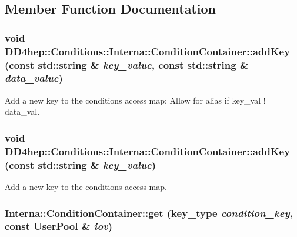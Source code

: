 \subsection{Member Function Documentation}
\hypertarget{class_d_d4hep_1_1_conditions_1_1_interna_1_1_condition_container_a04b12ce7b23723203334b6844306d079}{
\subsubsection[{addKey}]{\setlength{\rightskip}{0pt plus 5cm}void DD4hep::Conditions::Interna::ConditionContainer::addKey (const std::string \& {\em key\_\-value}, \/  const std::string \& {\em data\_\-value})}}
\label{class_d_d4hep_1_1_conditions_1_1_interna_1_1_condition_container_a04b12ce7b23723203334b6844306d079}


Add a new key to the conditions access map: Allow for alias if key\_\-val != data\_\-val. \hypertarget{class_d_d4hep_1_1_conditions_1_1_interna_1_1_condition_container_a74e97e0b749c515d2632ccc9bc079630}{
\subsubsection[{addKey}]{\setlength{\rightskip}{0pt plus 5cm}void DD4hep::Conditions::Interna::ConditionContainer::addKey (const std::string \& {\em key\_\-value})}}
\label{class_d_d4hep_1_1_conditions_1_1_interna_1_1_condition_container_a74e97e0b749c515d2632ccc9bc079630}


Add a new key to the conditions access map. \hypertarget{class_d_d4hep_1_1_conditions_1_1_interna_1_1_condition_container_a90e9c820b464a25d242823b7a0786a6a}{
\subsubsection[{get}]{ Interna::ConditionContainer::get ({\bf key\_\-type} {\em condition\_\-key}, \/  const {\bf UserPool} \& {\em iov})}}
\label{class_d_d4hep_1_1_conditions_1_1_interna_1_1_condition_container_a90e9c820b464a25d242823b7a0786a6a}


